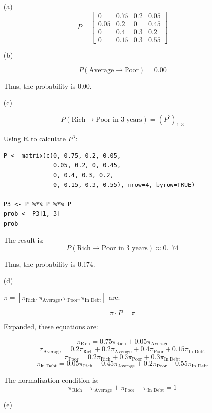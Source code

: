 \documentclass{article}
\begin{document}
\begin{enumerate}
    \item[(a)]
    \[
    P = 
    \begin{bmatrix}
    0 & 0.75 & 0.2 & 0.05 \\
    0.05 & 0.2 & 0 & 0.45 \\
    0 & 0.4 & 0.3 & 0.2 \\
    0 & 0.15 & 0.3 & 0.55
    \end{bmatrix}
    \]
    \item[(b)] 

\[
P(\text{Average} \to \text{Poor}) = 0.00
\]

Thus, the probability is $0.00$.

\item[(c)] 

\[
P(\text{Rich} \to \text{Poor in 3 years}) = (P^3)_{1,3}
\]

Using R to calculate $P^3$:

\begin{verbatim}
P <- matrix(c(0, 0.75, 0.2, 0.05,
              0.05, 0.2, 0, 0.45,
              0, 0.4, 0.3, 0.2,
              0, 0.15, 0.3, 0.55), nrow=4, byrow=TRUE)

P3 <- P %*% P %*% P
prob <- P3[1, 3]
prob
\end{verbatim}

The result is:
\[
P(\text{Rich} \to \text{Poor in 3 years}) \approx 0.174
\]

Thus, the probability is 0.174.

\item[(d)]

$\pi = [\pi_{\text{Rich}}, \pi_{\text{Average}}, \pi_{\text{Poor}}, \pi_{\text{In Debt}}]$ are:

\[
\pi \cdot P = \pi
\]

Expanded, these equations are:

\[
\pi_{\text{Rich}} = 0.75\pi_{\text{Rich}} + 0.05\pi_{\text{Average}}
\]
\[
\pi_{\text{Average}} = 0.2\pi_{\text{Rich}} + 0.2\pi_{\text{Average}} + 0.4\pi_{\text{Poor}} + 0.15\pi_{\text{In Debt}}
\]
\[
\pi_{\text{Poor}} = 0.2\pi_{\text{Rich}} + 0.3\pi_{\text{Poor}} + 0.3\pi_{\text{In Debt}}
\]
\[
\pi_{\text{In Debt}} = 0.05\pi_{\text{Rich}} + 0.45\pi_{\text{Average}} + 0.2\pi_{\text{Poor}} + 0.55\pi_{\text{In Debt}}
\]

The normalization condition is:
\[
\pi_{\text{Rich}} + \pi_{\text{Average}} + \pi_{\text{Poor}} + \pi_{\text{In Debt}} = 1
\]

\item[(e)]



\end{enumerate}
\end{document}
